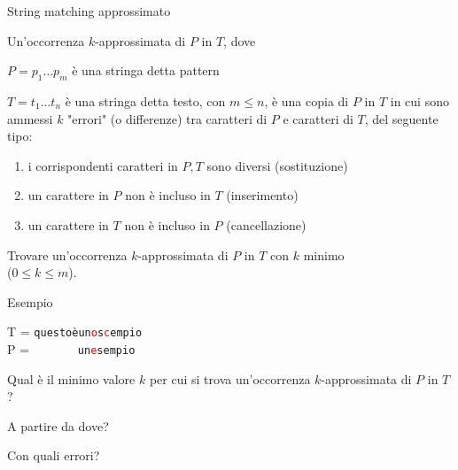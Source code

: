 \begin{frame}{String matching approssimato}

\vspace{-6pt}
\begin{myboxtitle}[Definizione]

Un'\alert{occorrenza $k$-approssimata} di $P$ in $T$, dove
\BI
\item $P = p_1 \ldots p_m$ è una stringa detta \alert{pattern}
\item $T = t_1 \ldots t_n$ è una stringa detta \alert{testo}, con $m \leq n$,
\EI
è una copia di $P$ in $T$ in cui sono ammessi $k$ "errori" (o differenze) tra caratteri di $P$ e caratteri di $T$, del seguente tipo:
\begin{enumerate}
\item i corrispondenti caratteri in $P, T$ sono diversi (\alert{sostituzione}) 
\item un carattere in $P$ non è incluso in $T$ (\alert{inserimento})
\item un carattere in $T$ non è incluso in $P$ (\alert{cancellazione})
\end{enumerate}
\end{myboxtitle}

\begin{myboxtitle}
Trovare un'occorrenza $k$-approssimata di $P$ in $T$ con $k$ minimo\\ 
($0 \leq k \leq m$).
\end{myboxtitle}

\end{frame}

\begin{frame}{Esempio}

\vspace{-6pt}
\begin{myboxtitle}[Esempio]
T = \texttt{questoèun\textcolor{red}{o}s\textcolor{red}{c}empio} \\
P = \texttt{~~~~~~~un\textcolor{red}{e}sempio}
\end{myboxtitle}

\begin{myboxtitle}[Domande]
\BIL
\item Qual è il minimo valore $k$ per cui si trova un'occorrenza $k$-approssimata di $P$ in $T$?
\item A partire da dove?
\item Con quali errori?
\EIL
\end{myboxtitle}

\end{frame}


